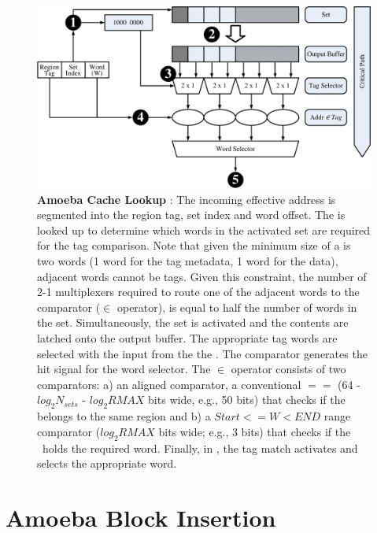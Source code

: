 \begin{figure}[h]
  \includegraphics[width=\textwidth]{files/Figures/06-Lookup.pdf}
  \caption[Amoeba Cache Lookup]{\textbf{Amoeba Cache Lookup} : The incoming effective address is segmented into the region tag, set index and word offset.  The  is looked up to determine which words in the activated set are required for the tag comparison. Note that given the minimum size of a \AB{} is two words (1 word for the tag metadata, 1 word for the data), adjacent words cannot be tags. Given this constraint, 
  the number of 2-1 multiplexers required to route one of the adjacent words to the comparator ($\in$ operator), is equal to half the number of words in the set.  Simultaneously, the set is activated and the contents are latched onto the output buffer.  The appropriate tag words are selected with the input from the the .  The comparator generates the hit signal for the word selector. The $\in$ operator consists of two comparators: a) an aligned  comparator, a conventional $==$ (64 - $log_2N_{sets}$ - $log_2{RMAX}$ bits wide, e.g., 50 bits) that checks if the \AB{} belongs to the same region and b) a $ Start <= W < END $ range comparator ($log_2RMAX$ bits wide; e.g., 3 bits) that checks if the \AB\ holds the required word. Finally, in , the tag match activates and selects the appropriate word.}
  \label{fig:ac_lookup}
\end{figure}

\clearpage

\section{Amoeba Block Insertion}

